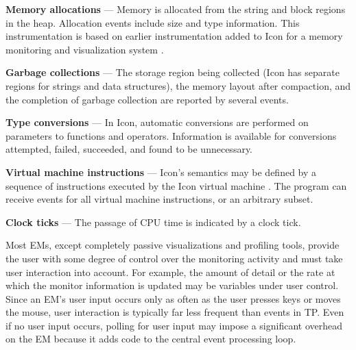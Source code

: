 \begin{list}{}{\itemsep 7pt} %
\item [{\bf Memory allocations}] --- Memory is allocated from the
	string and block regions in the heap.  Allocation events
	include size and type information.
	This instrumentation is based on earlier instrumentation added to Icon
	for a memory monitoring and visualization system \cite{Town89}.

\item [{\bf Garbage collections}] --- The storage region being
	collected (Icon has separate regions for strings and data
	structures), the memory layout after compaction, and the
	completion of garbage collection are reported by several events.
\item [{\bf Type conversions}] --- In Icon, automatic conversions are
	performed on parameters	to functions and
	operators.  Information is available for conversions
	attempted, failed, succeeded, and found to be unnecessary.
\item [{\bf Virtual machine instructions}] --- Icon's semantics may be
	defined by a sequence of instructions executed by the Icon virtual
	machine \cite{Gris86}.  The program can receive events for
	all virtual machine instructions, or an arbitrary subset.
\item [{\bf Clock ticks}] --- The  passage of CPU time
	is indicated by a clock tick.
\end{list}


Most EMs, except completely passive visualizations and profiling
tools, provide the user with some degree of control over the
monitoring activity and must take user interaction into account.
For example, the amount of detail or the rate at which the monitor
information is updated may be variables under user control.  Since
an EM's user input occurs only as often as the user presses keys or
moves the mouse, user interaction is typically far less frequent than
events in TP.  Even if no user input occurs, polling for user input
may impose a significant overhead on the EM because it adds code to
the central event processing loop.

